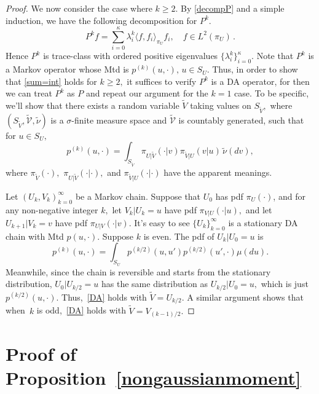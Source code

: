 \documentclass[11pt]{article}
\begin{document}
\begin{proof}
		We now consider the case where $k\geq 2.$ By
                \eqref{decompP} and a simple induction, we have the
                following decomposition for $P^k.$
		\[
		P^k f = \sum_{i=0}^{\kappa} \lambda_i^k \langle f, f_i
                \rangle_{\pi_U} f_i, \quad f \in L^2(\pi_U) \,.
		\]
		Hence $P^k$ is trace-class with ordered positive
                eigenvalues $\{\lambda_i^k\}_{i=0}^{\kappa}.$ Note
                that $P^k$ is a Markov operator whose Mtd is
                $p^{(k)}(u,\cdot), \, u \in S_U.$ Thus, in order to
                show that \eqref{sum=int} holds for $k \geq 2,$ it
                suffices to verify $P^k$ is a DA operator, for then we
                can treat $P^k$ as $P$ and repeat our argument for the
                $k=1$ case. To be specific, we'll show that there
                exists a random variable $\tilde{V}$ taking values on
                $S_{\tilde{V}},$ where $(S_{\tilde{V}},
                \mathcal{\tilde{V}}, \tilde{\nu})$ is a
                $\sigma$-finite measure space and
                $\mathcal{\tilde{V}}$ is countably generated, such
                that for $u \in S_U,$
		\begin{equation} \label{DA} p^{(k)}(u,\cdot) =
                  \int_{S_{\tilde{V}}} \pi_{U|\tilde{V}}(\cdot|v)
                  \pi_{\tilde{V}|U} (v|u) \, \tilde{\nu}(dv),
		\end{equation}
		where $\pi_{\tilde{V}}(\cdot),$ $\pi_{U|\tilde{V}}(\cdot|\cdot),$ and $\pi_{\tilde{V}|U} (\cdot|\cdot)$ have the apparent meanings.
		
		Let $(U_k,V_k)_{k=0}^{\infty}$ be a
		Markov chain. Suppose that $U_0$ has pdf
		$\pi_U(\cdot)$, and for any non-negative integer $k,$
		let $V_k|U_k=u$ have pdf
		$\pi_{V|U}(\cdot|u),$ and let
		$U_{k+1}|V_k=v$ have pdf
		$\pi_{U|V}(\cdot|v).$ It's easy to see
		$\{U_k\}_{k=0}^{\infty}$ is a stationary DA
		chain with Mtd $p(u,\cdot).$ Suppose $k$ is even. The
		pdf of $U_k|U_0 = u$ is
		\[
		p^{(k)}(u, \cdot) = \int_{S_U} p^{(k/2)}(u,u') p^{(k/2)}(u',\cdot) \mu(du).
		\]
		Meanwhile, since the chain is reversible and starts
		from the stationary distribution,
		$U_0|U_{k/2} = u$ has the same
		distribution as $U_{k/2}|U_0=u,$ which
		is just $p^{(k/2)}(u,\cdot).$ Thus,~\eqref{DA} holds
		with $\tilde{V} = U_{k/2}.$ A similar argument
		shows that when~$k$ is odd,~\eqref{DA} holds with
		$\tilde{V} = V_{(k-1)/2}.$
	\end{proof}
	
	\section{Proof of Proposition~\ref{nongaussianmoment}}
\end{document}
